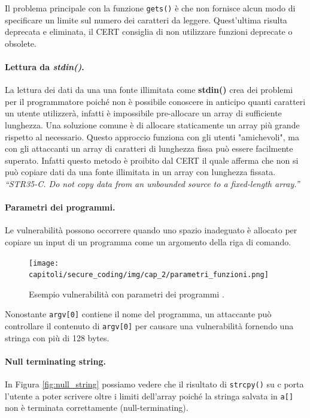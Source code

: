 Il problema principale con la funzione \verb|gets()| è che non fornisce alcun modo
di specificare un limite sul numero dei caratteri da leggere.
Quest'ultima risulta deprecata e eliminata, il CERT consiglia di non utilizzare
funzioni deprecate o obsolete.

\newpage

\paragraph{Lettura da \textit{stdin()}.}
La lettura dei dati da una una fonte illimitata come \textbf{stdin()} crea dei
problemi per il programmatore poiché non è possibile conoscere in anticipo quanti
caratteri un utente utilizzerà, infatti è impossibile pre-allocare un array di
sufficiente lunghezza. Una soluzione comune è di allocare staticamente un array più
grande rispetto al necessario. Questo approccio funziona con gli utenti "amichevoli",
ma con gli attaccanti un array di caratteri di lunghezza fissa può essere facilmente
superato. Infatti questo metodo è proibito dal CERT il quale afferma che non si può
copiare dati da una fonte illimitata in un array con lunghezza fissata.\\
\textit{“STR35-C. Do not copy data from an unbounded
    source to a fixed-length array.”}

\paragraph{Parametri dei programmi.}
Le vulnerabilità possono occorrere quando uno spazio inadeguato è allocato per
copiare un input di un programma come un argomento della riga di comando.

\begin{figure}[H]
    \centering
    \texttt{[image: capitoli/secure\_coding/img/cap\_2/parametri\_funzioni.png]}
    \caption{Esempio vulnerabilità con parametri dei programmi .}\label{fig:parametri_programmi}
\end{figure}

Nonostante \verb|argv[0]| contiene il nome del programma, un attaccante può
controllare il contenuto di \verb|argv[0]| per causare una vulnerabilità fornendo
una stringa con più di 128 bytes.

\paragraph{Null terminating string.}
In Figura \ref{fig:null_string} possiamo vedere che il risultato di \verb|strcpy()|
su c porta l'utente a poter scrivere oltre i limiti dell'array poiché la stringa
salvata in \verb|a[]| non è terminata correttamente (null-terminating).


